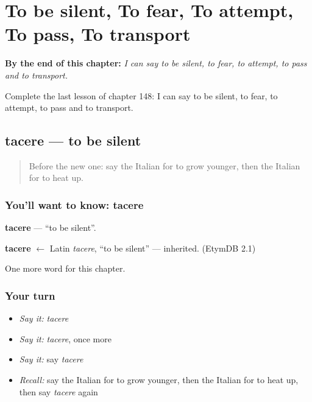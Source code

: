 
\chapter{To be silent, To fear, To attempt, To pass, To transport}
\label{ch:it-to-be-silent-to-fear-to-attempt-to-pass-to-transport}

\begin{chapteropening}
\textbf{By the end of this chapter:} \emph{I can say to be silent, to fear, to attempt, to pass and to transport.}

Complete the last lesson of chapter 148: I can say to be silent, to fear, to attempt, to pass and to transport.
\end{chapteropening}

\section[tacere]{tacere — to be silent}

\label{lesson:IT-C148-tacere}



\begin{quote}
Before the new one: say the Italian for to grow younger, then the Italian for to heat up.
\end{quote}

\subsection*{You'll want to know: tacere}
\textbf{tacere} — \textquotedblleft{}to be silent\textquotedblright{}.

\begin{cousinweb}
\textbf{tacere} $\leftarrow$ Latin \emph{tacere}, \textquotedblleft{}to be silent\textquotedblright{} — inherited. (EtymDB 2.1)
\end{cousinweb}

\begin{grammarlens}[title={What you've built}]
One more word for this chapter.
\end{grammarlens}

\subsection*{Your turn}
\begin{itemize}
\raggedright
  \item \emph{Say it:} \emph{tacere}
  \item \emph{Say it:} \emph{tacere}, once more
  \item \emph{Say it:} say \emph{tacere}
  \item \emph{Recall:} say the Italian for to grow younger, then the Italian for to heat up, then say \emph{tacere} again
\end{itemize}

